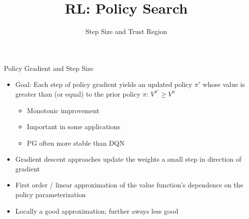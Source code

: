 \documentclass[aspectratio=169]{../latex_main/tntbeamer}  %
\title[RL: Policy Gradient]{RL: Policy Search}
\subtitle{Step Size and Trust Region}
\begin{document}
	
	\maketitle

\begin{frame}[c]{Policy Gradient and Step Size}
	
    \begin{itemize}
        \item Goal: Each step of policy gradient yields an updated policy $\pi'$ whose value is greater than (or equal) to the prior policy $\pi$: $V^{\pi'} \geq V^\pi$
        \begin{itemize}
            \item Monotonic improvement
            \item Important in some applications
            \item PG often more stable than DQN
        \end{itemize} 
        \item Gradient descent approaches update the weights a small step in direction of gradient
        \item First order / linear approximation of the value function's dependence on the policy parameterization
        \item Locally a good approximation; further aways less good
    \end{itemize}

\end{frame}
\end{document}
